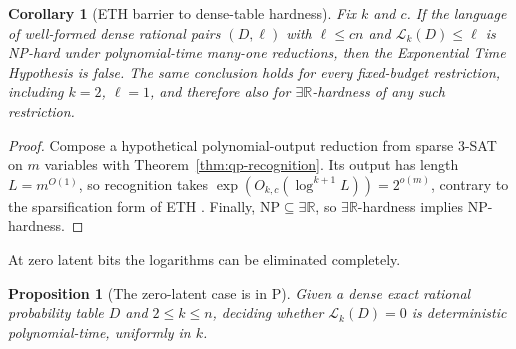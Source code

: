 \documentclass{article}
\newcommand{\LC}{\mathcal{L}}
\newtheorem{corollary}{Corollary}
\newtheorem{proposition}{Proposition}
\begin{document}
\begin{corollary}[ETH barrier to dense-table hardness]
\label{cor:recognition-eth}
Fix $k$ and $c$.  If the language of well-formed dense rational pairs
$(D,\ell)$ with $\ell\le cn$ and $\LC_k(D)\le\ell$ is NP-hard under
polynomial-time many-one reductions, then the Exponential Time Hypothesis is
false.  The same conclusion holds for every fixed-budget restriction,
including $k=2$, $\ell=1$, and therefore also for $\exists\mathbb R$-hardness
of any such restriction.
\end{corollary}

\begin{proof}
Compose a hypothetical polynomial-output reduction from sparse $3$-SAT on
$m$ variables with Theorem~\ref{thm:qp-recognition}.  Its output has length
$L=m^{O(1)}$, so recognition takes
$\exp(O_{k,c}(\log^{k+1}L))=2^{o(m)}$, contrary to the sparsification form of
ETH \cite{ipz01}.  Finally, $\mathrm{NP}\subseteq\exists\mathbb R$, so
$\exists\mathbb R$-hardness implies NP-hardness.
\end{proof}

At zero latent bits the logarithms can be eliminated completely.

\begin{proposition}[The zero-latent case is in $\mathrm P$]
\label{prop:zero-latent-p}
Given a dense exact rational probability table $D$ and $2\le k\le n$, deciding
whether $\LC_k(D)=0$ is deterministic polynomial-time, uniformly in $k$.
\end{proposition}
\end{document}
